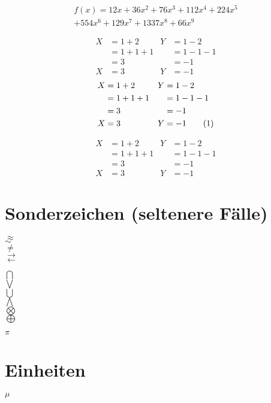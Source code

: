 \documentclass{scrarticle}
\begin{document}
	\begin{multline*}
		f(x) = 12x + 36x^2 + 76x^3 + 112x^4 + 224x^5\\
		 + 554x^6 + 129x^7 + 1337x^8 + 66x^9
	\end{multline*}

	\begin{align}
		 X &= 1 + 2 	& Y  &= 1 - 2\\
		   &= 1 + 1 + 1 &	 &= 1 - 1 - 1\\
		   &= 3 		&	 &= -1\\
		 X &= 3 		& Y  &= -1  
	\end{align}
	\newcommand\numberthis{\addtocounter{equation}{1}\tag{\theequation}} %
	\begin{align*}
		X	&= 1 + 2 		& Y &= 1 - 2\\
			&= 1 + 1 + 1 	& 	&= 1 - 1 - 1\\
			&= 3 			& 	&= -1\\
		X	&= 3 			& Y &= -1 \numberthis
	\end{align*}

	\begin{align}
		X	&= 1 + 2 		& Y &= 1 - 2\nonumber \\
		&= 1 + 1 + 1 	& 	&= 1 - 1 - 1\nonumber \\
		&= 3 			& 	&= -1		\nonumber \\
		X	&= 3 			& Y &= -1	
	\end{align}

	\newpage

	\section{Sonderzeichen (seltenere Fälle)}
	$\approx$ \\
	$\sim$ \\
	$\neq$ \\
	$\rightarrow$ \\
	$\leftarrow$
	
	\vspace*{1cm}
	\noindent
	$\bigcap$ \\
	$\bigvee$ \\
	$\bigcup$ \\
	$\bigwedge$ \\
	$\bigotimes$ \\
	$\bigoplus$
	
	\vspace*{1cm}
	\noindent
	
	$\pi$
	\section{Einheiten}
	$\mu$ %
\end{document}

